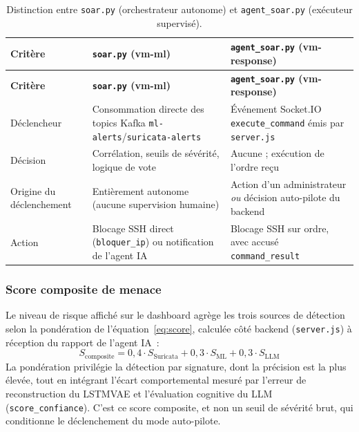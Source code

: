 \renewcommand{\arraystretch}{1.25}
\small
\begin{xltabular}{\textwidth}{|l|>{\raggedright\arraybackslash}X|>{\raggedright\arraybackslash}X|}

\caption{Distinction entre \texttt{soar.py} (orchestrateur autonome) et \texttt{agent\_soar.py} (exécuteur supervisé).}
\label{tab:soar-vs-agentsoar} \\

\hline
{}
\textbf{Critère} & \textbf{\texttt{soar.py} (vm-ml)} & \textbf{\texttt{agent\_soar.py} (vm-response)} \\ \hline
\endfirsthead

\hline
{}
\textbf{Critère} & \textbf{\texttt{soar.py} (vm-ml)} & \textbf{\texttt{agent\_soar.py} (vm-response)} \\ \hline
\endhead

Déclencheur & Consommation directe des topics Kafka \texttt{ml-alerts}/\texttt{suricata-alerts} & Événement Socket.IO \texttt{execute\_command} émis par \texttt{server.js} \\ \hline
Décision & Corrélation, seuils de sévérité, logique de vote & Aucune ; exécution de l'ordre reçu \\ \hline
Origine du déclenchement & Entièrement autonome (aucune supervision humaine) & Action d'un administrateur \emph{ou} décision auto-pilote du backend \\ \hline
Action & Blocage SSH direct (\texttt{bloquer\_ip}) ou notification de l'agent IA & Blocage SSH sur ordre, avec accusé \texttt{command\_result} \\ \hline

\end{xltabular}

\subsubsection{Score composite de menace}
Le niveau de risque affiché sur le dashboard agrège les trois sources de détection selon la pondération de l'équation~\eqref{eq:score}, calculée côté backend (\texttt{server.js}) à réception du rapport de l'agent IA~:
\begin{equation}
S_{\text{composite}} = 0{,}4\cdot S_{\text{Suricata}} + 0{,}3\cdot S_{\text{ML}} + 0{,}3\cdot S_{\text{LLM}}
\label{eq:score}
\end{equation}
La pondération privilégie la détection par signature, dont la précision est la plus élevée, tout en intégrant l'écart comportemental mesuré par l'erreur de reconstruction du \ac{LSTMVAE} \cite{kingma2014vae,hochreiter1997lstm} et l'évaluation cognitive du \ac{LLM} (\texttt{score\_confiance}). C'est ce score composite, et non un seuil de sévérité brut, qui conditionne le déclenchement du mode auto-pilote.

